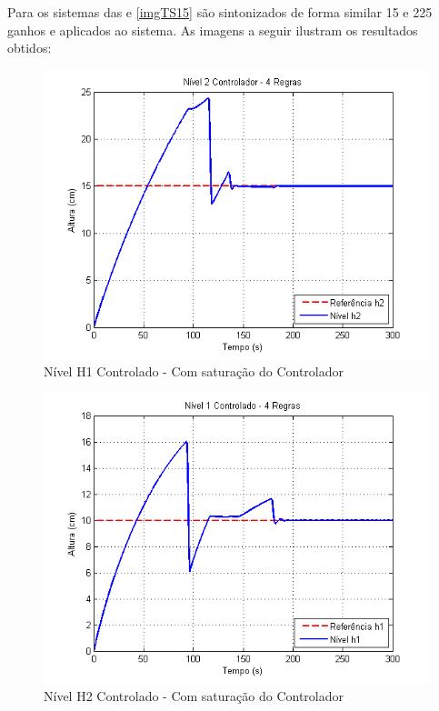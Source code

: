 Para os sistemas das  e \ref{imgTS15} são sintonizados de forma similar 15 e 225 ganhos e aplicados ao sistema. As imagens a seguir ilustram os resultados obtidos:
\begin{figure}[H]
	\centering
	\includegraphics[height=0.35\paperheight ,keepaspectratio]{img/ctrl_h1ts2_ulim.png}
	\caption{\small Nível H1 Controlado - Com saturação do Controlador }
	\label{figH1TSCtrl2_ulim}
\end{figure}

\begin{figure}[H]
	\centering
	\includegraphics[height=0.35\paperheight ,keepaspectratio]{img/ctrl_h2ts2_ulim.png}
	\caption{Nível H2 Controlado - Com saturação do Controlador }
	\label{figH2CtrlTS2_ulim}
\end{figure}

